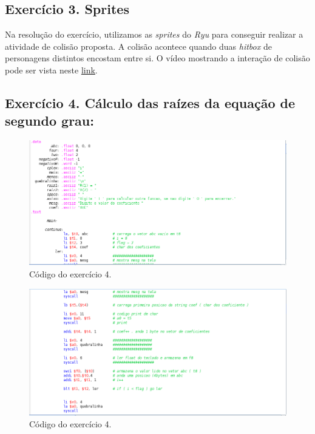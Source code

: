 \documentclass[12pt]{article}
\begin{document}
\subsection{Exercício 3. Sprites}
\label{subsec:sprites}

Na resolução do exercício, utilizamos as \textit{sprites} do \textit{Ryu} para conseguir realizar a atividade de colisão proposta. A colisão acontece quando duas \textit{hitbox} de personagens distintos encostam entre si. O vídeo mostrando a interação de colisão pode ser vista neste \href{https://www.youtube.com/watch?v=kbTLQQuw6RA}{link}.


\subsection{Exercício 4. Cálculo das raízes da equação de segundo grau:}
\label{subsec:raizes}

\begin{figure}[H]
	\centering
	\includegraphics[width=1\textwidth]{EX_4_1.png}
	\caption{Código do exercício 4.}
	\label{fig:hilo1}
\end{figure}

\begin{figure}[H]
	\centering
	\includegraphics[width=1\textwidth]{EX_4_2.png}
	\caption{Código do exercício 4.}
	\label{fig:hilo2}
\end{figure}
\end{document}
